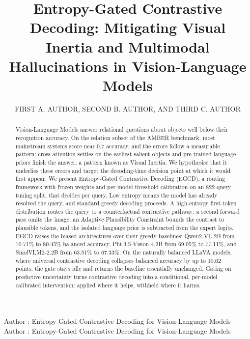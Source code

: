 \documentclass{ieeeaccess}
\begin{document}

\title{Entropy-Gated Contrastive Decoding: Mitigating Visual Inertia and Multimodal Hallucinations in Vision-Language Models}
\author{\uppercase{First A. Author}, \uppercase{Second B. Author}, AND \uppercase{Third C. Author}}

\address[1]{Department of Computer Science, Affiliation Name, Street Address, City 000000, State, Country (e-mail: corresponding.author@example.org; second.author@example.org; third.author@example.org).}

\markboth
{Author \headeretal: Entropy-Gated Contrastive Decoding for Vision-Language Models}
{Author \headeretal: Entropy-Gated Contrastive Decoding for Vision-Language Models}


\begin{abstract}
Vision-Language Models answer relational questions about objects well below their recognition accuracy. On the relation subset of the AMBER benchmark, most mainstream systems score near 0.7 accuracy, and the errors follow a measurable pattern: cross-attention settles on the earliest salient objects and pre-trained language priors finish the answer, a pattern known as Visual Inertia. We hypothesise that it underlies these errors and target the decoding-time decision point at which it would first appear. We present Entropy-Gated Contrastive Decoding (EGCD), a routing framework with frozen weights and per-model threshold calibration on an 822-query tuning split, that decides per query. Low entropy means the model has already resolved the query, and standard greedy decoding proceeds. A high-entropy first-token distribution routes the query to a counterfactual contrastive pathway: a second forward pass omits the image, an Adaptive Plausibility Constraint bounds the contrast to plausible tokens, and the isolated language prior is subtracted from the expert logits. EGCD raises the biased architectures over their greedy baselines: Qwen2-VL-2B from 70.71\% to 80.45\% balanced accuracy, Phi-3.5-Vision-4.2B from 69.05\% to 77.11\%, and SmolVLM2-2.2B from 63.51\% to 67.33\%. On the naturally balanced LLaVA models, where universal contrastive decoding collapses balanced accuracy by up to 10.62 points, the gate stays idle and returns the baseline essentially unchanged. Gating on predictive uncertainty turns contrastive decoding into a conditional, per-model calibrated intervention: applied where it helps, withheld where it harms.
\end{abstract}
\end{document}
